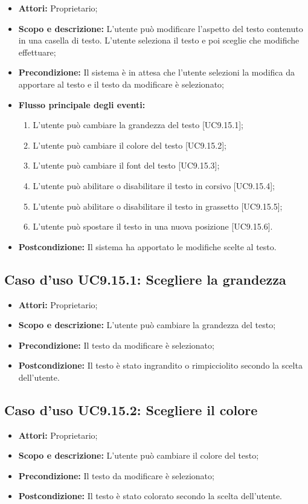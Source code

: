 \begin{itemize}
	\item \textbf{Attori:} Proprietario;
	\item \textbf{Scopo e descrizione:} L'utente può modificare l'aspetto del testo contenuto in una casella di testo. L'utente seleziona il testo e poi sceglie che modifiche effettuare;
	\item \textbf{Precondizione:} Il sistema è in attesa che l'utente selezioni la modifica da apportare al testo e il testo da modificare è selezionato;
	\item \textbf{Flusso principale degli eventi:}
	\begin{enumerate}
		\item L'utente può cambiare la grandezza del testo [UC9.15.1];
		\item L'utente può cambiare il colore del testo [UC9.15.2];
		\item L'utente può cambiare il \gls{font} del testo [UC9.15.3];
		\item L'utente può abilitare o disabilitare il testo in corsivo [UC9.15.4];
		\item L'utente può abilitare o disabilitare il testo in grassetto [UC9.15.5];
		\item L'utente può spostare il testo in una nuova posizione [UC9.15.6].
	\end{enumerate}
	\item \textbf{Postcondizione:} Il sistema ha apportato le modifiche scelte al testo.
\end{itemize}

\subsection{Caso d'uso UC9.15.1: Scegliere la grandezza}
\begin{itemize}
	\item \textbf{Attori:} Proprietario;
	\item \textbf{Scopo e descrizione:} L'utente può cambiare la grandezza del testo;
	\item \textbf{Precondizione:} Il testo da modificare è selezionato;
	\item \textbf{Postcondizione:} Il testo è stato ingrandito o rimpicciolito secondo la scelta dell'utente.
\end{itemize}

\subsection{Caso d'uso UC9.15.2: Scegliere il colore}
\begin{itemize}
	\item \textbf{Attori:} Proprietario;
	\item \textbf{Scopo e descrizione:} L'utente può cambiare il colore del testo;
	\item \textbf{Precondizione:} Il testo da modificare è selezionato;
	\item \textbf{Postcondizione:} Il testo è stato colorato secondo la scelta dell'utente.
\end{itemize}

